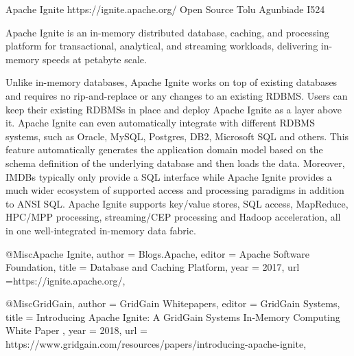 Apache Ignite 
https://ignite.apache.org/ 
Open Source 
Tolu Agunbiade 
I524

Apache Ignite is an in-memory distributed database, caching, and processing
platform for transactional, analytical, and streaming workloads, delivering
in-memory speeds at petabyte scale\cite{Apache Ignite}.

Unlike in-memory databases, Apache Ignite works on top of existing databases and
requires no rip-and-replace or any changes to an existing RDBMS. Users can keep
their existing RDBMSs in place and deploy Apache Ignite as a layer above it.
Apache Ignite can even automatically integrate with different RDBMS systems,
such as Oracle, MySQL, Postgres, DB2, Microsoft SQL and others. This feature
automatically generates the application domain model based on the schema
definition of the underlying database and then loads the data. Moreover, IMDBs
typically only provide a SQL interface while Apache Ignite provides a much wider
ecosystem of supported access and processing paradigms in addition to ANSI SQL.
Apache Ignite supports key/value stores, SQL access, MapReduce, HPC/MPP
processing, streaming/CEP processing and Hadoop acceleration, all in one
well-integrated in-memory data fabric\cite{GridGain}.


@Misc{Apache Ignite, 
author = {Blogs.Apache}, 
editor = {Apache Software Foundation}, 
title = {Database and Caching Platform}, 
year = {2017}, 
url ={https://ignite.apache.org/}, 
}


@Misc{GridGain, 
author = {GridGain Whitepapers}, 
editor = {GridGain Systems},
title = {Introducing Apache Ignite: A GridGain Systems In-Memory Computing White Paper }, 
year = {2018}, 
url = {https://www.gridgain.com/resources/papers/introducing-apache-ignite}, 
}
